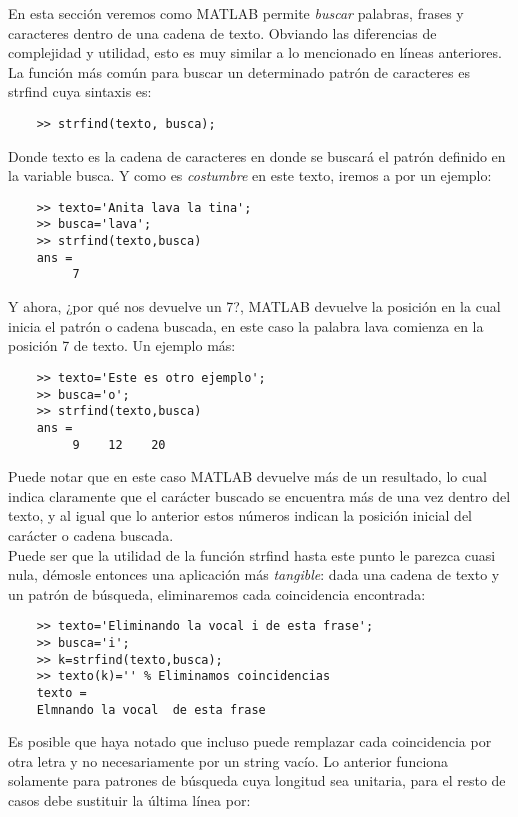 En esta sección veremos como MATLAB permite \textit{buscar} palabras, frases y caracteres 
dentro de una cadena de texto. Obviando las diferencias de complejidad y utilidad, esto es 
muy similar a lo mencionado en líneas anteriores.\\

La función más común para buscar un determinado patrón de caracteres es strfind cuya sintaxis es:

\begin{verbatim}
	>> strfind(texto, busca);
\end{verbatim}

Donde texto es la cadena de caracteres en donde se buscará el patrón definido en la 
variable busca. Y  como es \textit{costumbre} en este texto, iremos a por un ejemplo:

\begin{verbatim}
	>> texto='Anita lava la tina';
	>> busca='lava';
	>> strfind(texto,busca)
	ans =
	     7
\end{verbatim}

Y ahora, ¿por qué nos devuelve un 7?, MATLAB devuelve la posición en la cual inicia el patrón 
o cadena buscada, en este caso la palabra lava comienza en la posición 7 de texto. Un ejemplo más:

\begin{verbatim}
	>> texto='Este es otro ejemplo';
	>> busca='o';
	>> strfind(texto,busca)
	ans =
	     9    12    20
\end{verbatim}

Puede notar que en este caso MATLAB devuelve más de un resultado, lo cual indica claramente 
que el carácter buscado se encuentra más de una vez dentro del texto, y al igual que lo 
anterior estos números indican la posición inicial del carácter o cadena buscada.\\

Puede ser que la utilidad de la función strfind hasta este punto le parezca cuasi nula, démosle 
entonces una aplicación más \textit{tangible}: dada una cadena de texto y un patrón de búsqueda, 
eliminaremos cada coincidencia encontrada:

\begin{verbatim}
	>> texto='Eliminando la vocal i de esta frase';
	>> busca='i';
	>> k=strfind(texto,busca);
	>> texto(k)='' % Eliminamos coincidencias
	texto =
	Elmnando la vocal  de esta frase
\end{verbatim}

Es posible que haya notado que incluso puede remplazar cada coincidencia por otra letra y no 
necesariamente por un string vacío. Lo anterior funciona solamente para patrones de búsqueda 
cuya longitud sea unitaria, para el resto de casos debe sustituir la última línea por:

